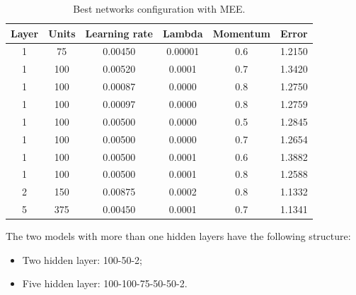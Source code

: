 \begin{table}[h!]
	\centering
	\begin{tabular}{|c|c|c|c|c|c|}
		\hline
		\textbf{Layer}& \textbf{Units}& \textbf{Learning rate} & \multicolumn{1}{l|}{\textbf{Lambda}} & \textbf{Momentum} & \textbf{Error}\\ \hline
			1 & 75 & 0.00450 & 0.00001 & 0.6  & 1.2150  \\
			1 & 100 & 0.00520 & 0.0001 & 0.7  & 1.3420 \\
			1 & 100 & 0.00087 & 0.0000 & 0.8  & 1.2750 \\
			1 & 100 & 0.00097 & 0.0000 & 0.8  & 1.2759 \\
			1 & 100 & 0.00500 & 0.0000 & 0.5  & 1.2845 \\
			1 & 100 & 0.00500 & 0.0000 & 0.7  & 1.2654 \\
			1 & 100 & 0.00500 & 0.0001 & 0.6  & 1.3882 \\
			1 & 100 & 0.00500 & 0.0001 & 0.8  & 1.2588 \\
			2 & 150 & 0.00875 & 0.0002 & 0.8  & 1.1332 \\
			5 & 375 & 0.00450 & 0.0001 & 0.7  & 1.1341 \\
		  \hline
	\end{tabular}
	\label{net:best-result}
		\caption{Best networks configuration with MEE.}
\end{table}

The two models with more than one hidden layers have the following structure:
\begin{itemize}
	\item Two hidden layer: 100-50-2;
	\item Five hidden layer: 100-100-75-50-50-2.
\end{itemize}


